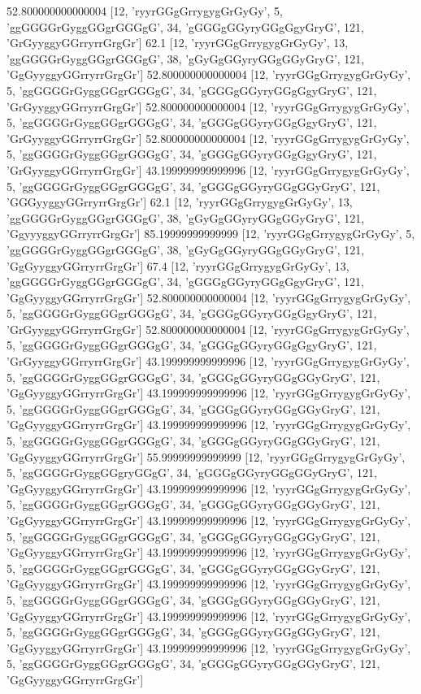 52.800000000000004 [12, 'ryyrGGgGrrygygGrGyGy', 5, 'ggGGGGrGyggGGgrGGGgG', 34, 'gGGGgGGyryGGgGgyGryG', 121, 'GrGyyggyGGrryrrGrgGr']
62.1 [12, 'ryyrGGgGrrygygGrGyGy', 13, 'ggGGGGrGyggGGgrGGGgG', 38, 'gGyGgGGyryGGgGGyGryG', 121, 'GgGyyggyGGrryrrGrgGr']
52.800000000000004 [12, 'ryyrGGgGrrygygGrGyGy', 5, 'ggGGGGrGyggGGgrGGGgG', 34, 'gGGGgGGyryGGgGgyGryG', 121, 'GrGyyggyGGrryrrGrgGr']
52.800000000000004 [12, 'ryyrGGgGrrygygGrGyGy', 5, 'ggGGGGrGyggGGgrGGGgG', 34, 'gGGGgGGyryGGgGgyGryG', 121, 'GrGyyggyGGrryrrGrgGr']
52.800000000000004 [12, 'ryyrGGgGrrygygGrGyGy', 5, 'ggGGGGrGyggGGgrGGGgG', 34, 'gGGGgGGyryGGgGgyGryG', 121, 'GrGyyggyGGrryrrGrgGr']
43.199999999999996 [12, 'ryyrGGgGrrygygGrGyGy', 5, 'ggGGGGrGyggGGgrGGGgG', 34, 'gGGGgGGyryGGgGGyGryG', 121, 'GGGyyggyGGrryrrGrgGr']
62.1 [12, 'ryyrGGgGrrygygGrGyGy', 13, 'ggGGGGrGyggGGgrGGGgG', 38, 'gGyGgGGyryGGgGGyGryG', 121, 'GgyyyggyGGrryrrGrgGr']
85.19999999999999 [12, 'ryyrGGgGrrygygGrGyGy', 5, 'ggGGGGrGyggGGgrGGGgG', 38, 'gGyGgGGyryGGgGGyGryG', 121, 'GgGyyggyGGrryrrGrgGr']
67.4 [12, 'ryyrGGgGrrygygGrGyGy', 13, 'ggGGGGrGyggGGgrGGGgG', 34, 'gGGGgGGyryGGgGgyGryG', 121, 'GgGyyggyGGrryrrGrgGr']
52.800000000000004 [12, 'ryyrGGgGrrygygGrGyGy', 5, 'ggGGGGrGyggGGgrGGGgG', 34, 'gGGGgGGyryGGgGgyGryG', 121, 'GrGyyggyGGrryrrGrgGr']
52.800000000000004 [12, 'ryyrGGgGrrygygGrGyGy', 5, 'ggGGGGrGyggGGgrGGGgG', 34, 'gGGGgGGyryGGgGgyGryG', 121, 'GrGyyggyGGrryrrGrgGr']
43.199999999999996 [12, 'ryyrGGgGrrygygGrGyGy', 5, 'ggGGGGrGyggGGgrGGGgG', 34, 'gGGGgGGyryGGgGGyGryG', 121, 'GgGyyggyGGrryrrGrgGr']
43.199999999999996 [12, 'ryyrGGgGrrygygGrGyGy', 5, 'ggGGGGrGyggGGgrGGGgG', 34, 'gGGGgGGyryGGgGGyGryG', 121, 'GgGyyggyGGrryrrGrgGr']
43.199999999999996 [12, 'ryyrGGgGrrygygGrGyGy', 5, 'ggGGGGrGyggGGgrGGGgG', 34, 'gGGGgGGyryGGgGGyGryG', 121, 'GgGyyggyGGrryrrGrgGr']
55.99999999999999 [12, 'ryyrGGgGrrygygGrGyGy', 5, 'ggGGGGrGyggGGgryGGgG', 34, 'gGGGgGGyryGGgGGyGryG', 121, 'GgGyyggyGGrryrrGrgGr']
43.199999999999996 [12, 'ryyrGGgGrrygygGrGyGy', 5, 'ggGGGGrGyggGGgrGGGgG', 34, 'gGGGgGGyryGGgGGyGryG', 121, 'GgGyyggyGGrryrrGrgGr']
43.199999999999996 [12, 'ryyrGGgGrrygygGrGyGy', 5, 'ggGGGGrGyggGGgrGGGgG', 34, 'gGGGgGGyryGGgGGyGryG', 121, 'GgGyyggyGGrryrrGrgGr']
43.199999999999996 [12, 'ryyrGGgGrrygygGrGyGy', 5, 'ggGGGGrGyggGGgrGGGgG', 34, 'gGGGgGGyryGGgGGyGryG', 121, 'GgGyyggyGGrryrrGrgGr']
43.199999999999996 [12, 'ryyrGGgGrrygygGrGyGy', 5, 'ggGGGGrGyggGGgrGGGgG', 34, 'gGGGgGGyryGGgGGyGryG', 121, 'GgGyyggyGGrryrrGrgGr']
43.199999999999996 [12, 'ryyrGGgGrrygygGrGyGy', 5, 'ggGGGGrGyggGGgrGGGgG', 34, 'gGGGgGGyryGGgGGyGryG', 121, 'GgGyyggyGGrryrrGrgGr']
43.199999999999996 [12, 'ryyrGGgGrrygygGrGyGy', 5, 'ggGGGGrGyggGGgrGGGgG', 34, 'gGGGgGGyryGGgGGyGryG', 121, 'GgGyyggyGGrryrrGrgGr']
